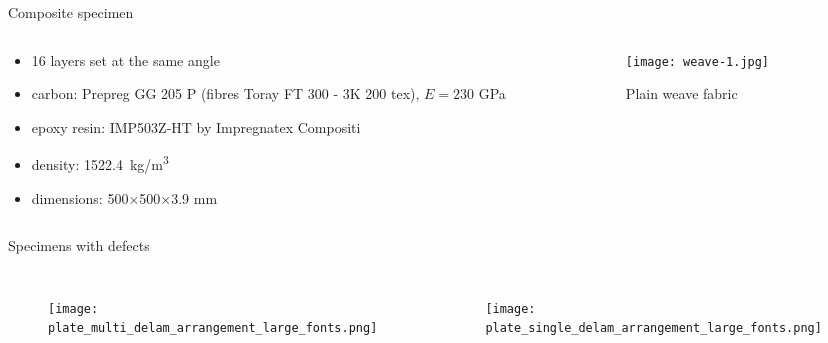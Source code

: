 \documentclass[10pt,aspectratio=169,dvipsnames]{beamer} %
\newcounter{angle}
\begin{document}
	\begin{frame}[t]{Composite specimen}
		\begin{columns}[T]
			\begin{column}[c]{0.6\textwidth}
				\begin{itemize}
					\item 16 layers set at the same angle 
					\item carbon: Prepreg GG 205 P (fibres Toray FT 300 - 3K 200 tex), $E=230$ GPa
					\item epoxy resin: IMP503Z-HT by Impregnatex Compositi 						
					\item density: 1522.4~kg/m\textsuperscript{3}
					\item dimensions: 500$\times$500$\times$3.9 mm
				\end{itemize}			
			\end{column}
			\begin{column}[c]{0.4\textwidth}
				\begin{figure}
					\centering
					\texttt{[image: weave-1.jpg]}
					\caption{Plain weave fabric}
				\end{figure}
			\end{column}			
		\end{columns}
	\end{frame}
	\begin{frame}[t]{Specimens with defects}
		\vspace{-0.5cm}
		\begin{columns}[T]
			\begin{figure}
				\texttt{[image: plate\_multi\_delam\_arrangement\_large\_fonts.png]}
			\end{figure}
			\begin{figure}
				\texttt{[image: plate\_single\_delam\_arrangement\_large\_fonts.png]}
			\end{figure}
		\end{columns}
	\end{frame}
\end{document}

